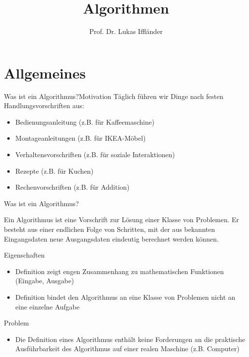 \documentclass[xelatex,aspectratio=169]{beamer}
\title{Algorithmen}
\author{Prof. Dr. Lukas Iffländer}
\institute{HTW Dresden}
\date{}
\begin{document}
\begin{frame}
  \titlepage
\end{frame}

\section{Allgemeines}

\begin{frame}{Was ist ein Algorithmus?}{Motivation}
  Täglich führen wir Dinge nach festen Handlungsvorschriften aus:
  \begin{itemize}
    \item Bedienungsanleitung (z.B. für Kaffeemaschine)
    \item Montageanleitungen (z.B. für IKEA-Möbel)
    \item Verhaltensvorschriften (z.B. für soziale Interaktionen)
    \item Rezepte (z.B. für Kuchen)
    \item Rechenvorschriften (z.B. für Addition)
  \end{itemize}

\end{frame}

\begin{frame}{Was ist ein Algorithmus?}
  \begin{definition}
    Ein Algorithmus ist eine Vorschrift zur Lösung einer Klasse von
    Problemen. Er besteht aus einer endlichen Folge von Schritten,
    mit der aus bekannten Eingangsdaten neue Ausgangsdaten eindeutig berechnet werden können.
  \end{definition}

  \begin{block}{Eigenschaften}
    \begin{itemize}
      \item Definition zeigt engen Zusammenhang zu mathematischen Funktionen (Eingabe, Ausgabe)
      \item Definition bindet den Algorithmus an eine Klasse von Problemen nicht an eine einzelne Aufgabe
    \end{itemize}
  \end{block}

  \begin{alertblock}{Problem}
    \begin{itemize}
      \item Die Definition eines Algorithmus enthält keine Forderungen an die praktische Ausführbarkeit des Algorithmus auf einer realen Maschine (z.B. Computer)
    \end{itemize}
  \end{alertblock}
\end{frame}
\end{document}
